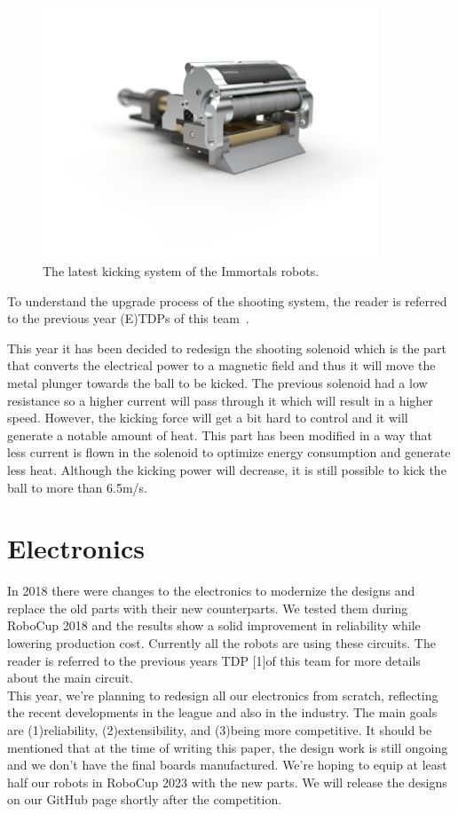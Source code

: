 \documentclass[runningheads]{llncs}
\begin{document}
\begin{figure}
\centering
\includegraphics[width=10cm]{images/kicking_system.jpg}
\caption{The latest kicking system of the Immortals robots.} \label{fig_Kick_Sys}
\end{figure}

To understand the upgrade process of the shooting system, the reader is referred to the previous year (E)TDPs of this team~\cite{ref_ETDP2019,ref_ETDP2018}.

This year it has been decided to redesign the shooting solenoid which is the part that converts the electrical power to a magnetic field and thus it will move the metal plunger towards the ball to be kicked. The previous solenoid had a low resistance so a higher current will pass through it which will result in a higher speed. However, the kicking force will get a bit hard to control and it will generate a notable amount of heat. This part has been modified in a way that less current is flown in the solenoid to optimize energy consumption and generate less heat. Although the kicking power will decrease, it is still possible to kick the ball to more than 6.5m/s.

\section{Electronics}

In 2018 there were changes to the electronics to modernize the designs and replace the old parts with their new counterparts. We tested them during RoboCup 2018 and the results show a solid improvement in reliability while lowering production cost. Currently all the robots are using these circuits. The reader is referred to the previous years TDP [1]of this team for more details about the main circuit.\\
\indent This year, we're planning to redesign all our electronics from scratch, reflecting the recent developments in the league and also in the industry. The main goals are (1)reliability, (2)extensibility, and (3)being more competitive. It should be mentioned that at the time of writing this paper, the design work is still ongoing and we don't have the final boards manufactured. We're hoping to equip at least half our robots in RoboCup 2023 with the new parts. We will release the designs on our GitHub page shortly after the competition.
\end{document}
